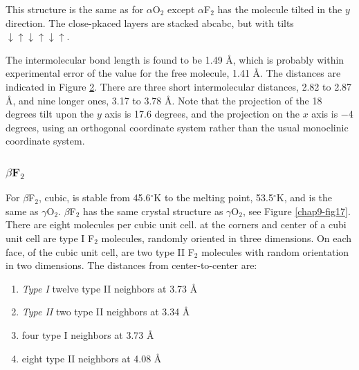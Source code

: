 \begin{figure}
\caption{}
\label{chap9-fig18}
\end{figure}

This structure is the same as for $\alpha$O$_2$ except $\alpha$F$_2$ 
has the molecule tilted in the $y$ direction.  The close-pkaced layers 
are stacked abcabc, but with tilts $\downarrow \uparrow \downarrow 
\uparrow \downarrow \uparrow$.

The intermolecular bond length is found to be 1.49 \AA, which is probably 
within experimental error of the value for the free molecule, 1.41 
\AA.  The distances are indicated in Figure \ref{chap9-fig19}.  There are three
short intermolecular distances, 2.82 to 2.87 \AA, and nine longer
ones, 3.17 to 3.78 \AA.  Note that the projection of the 18 degrees
tilt upon the $y$ axis is 17.6 degrees, and the projection on the $x$
axis is $-$4 degrees, using an orthogonal coordinate system rather
than the usual monoclinic coordinate system.

\begin{figure}
\caption{}
\label{chap9-fig19}
\end{figure}


\subsubsection{$\beta$F$_2$}

For $\beta$F$_2$, cubic, is stable from 45.6$^{\circ}$K to the melting
point, 53.5$^{\circ}$K, and is the same as $\gamma$O$_2$.
$\beta$F$_2$ has the same crystal structure as $\gamma$O$_2$, see
Figure \ref{chap9-fig17}.  There are eight molecules per cubic unit
cell. at the corners and center of a cubi unit cell are type I F$_2$
molecules, randomly oriented in three dimensions.  On each face, of
the cubic unit cell, are two type II F$_2$ molecules with random
orientation in two dimensions.  The distances from center-to-center
are:

\begin{enumerate}
\item \emph{Type I} twelve type II neighbors at 3.73 \AA
\item \emph{Type II} two type II neighbors at 3.34 \AA
\item four type I neighbors at 3.73 \AA
\item eight type II neighbors at 4.08 \AA
\end{enumerate}

